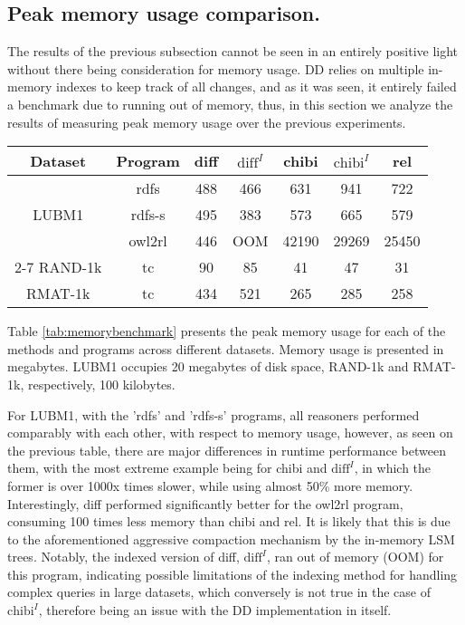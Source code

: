 \documentclass[sigconf,screen,review,natbib]{acmart}
\theoremstyle{definition}
\begin{document}
\subsection{Peak memory usage comparison.}
The results of the previous subsection cannot be seen in an entirely positive light without there being consideration for memory usage. DD relies on multiple
in-memory indexes to keep track of all changes, and as it was seen, it entirely failed a benchmark due to running out of memory, thus, in this section we analyze the results of
measuring peak memory usage over the previous experiments.
\begin{table*}
	\caption{Memory usage experimental results}
	\begin{center}
		\begin{tabular}{|c|c|c|c|c|c|c|}
			\hline
			Dataset                & Program & diff & $\text{diff}^{I}$ & chibi & $\text{chibi}^{I}$ & rel   \\
			\hline
			\multirow{3}{*}{LUBM1} & rdfs    & 488  & 466               & 631   & 941                & 722   \\
			                       & rdfs-s  & 495  & 383               & 573   & 665                & 579   \\
			                       & owl2rl  & 446  & OOM               & 42190 & 29269              & 25450 \\
			\cline{2-7}
			\hline
			RAND-1k                & tc      & 90   & 85                & 41    & 47                 & 31    \\
			\hline
			RMAT-1k                & tc      & 434  & 521               & 265   & 285                & 258   \\
			\hline
		\end{tabular}
	\end{center}
	\label{tab:memorybenchmark}
\end{table*}
Table \ref{tab:memorybenchmark} presents the peak memory usage for each of the methods and programs across different datasets. Memory usage is presented in megabytes. LUBM1
occupies 20 megabytes of disk space, RAND-1k and RMAT-1k, respectively, 100 kilobytes.

For LUBM1, with the 'rdfs' and 'rdfs-s' programs, all reasoners performed comparably with each other, with respect to memory usage, however, as seen on the previous table,
there are major differences in runtime performance between them, with the most extreme example being for chibi and $\text{diff}^{I}$, in which the former is over 1000x times
slower, while using almost 50\% more memory. Interestingly, diff performed significantly better for the owl2rl program, consuming 100 times less memory than chibi and rel. It
is likely that this is due to the aforementioned aggressive compaction mechanism by the in-memory LSM trees. Notably, the indexed version of diff, $\text{diff}^{I}$, ran out of
memory (OOM) for this program, indicating possible limitations of the indexing method for handling complex queries in large datasets, which conversely is not true in the case
of $\text{chibi}^{I}$, therefore being an issue with the DD implementation in itself.
\end{document}
